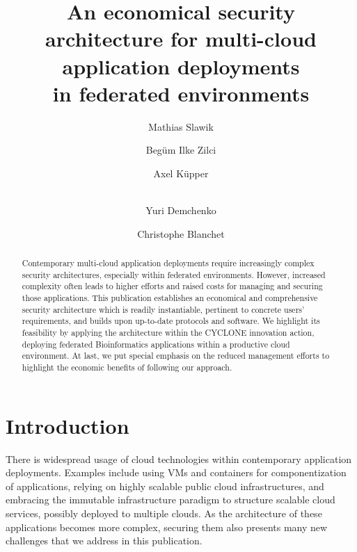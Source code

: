 \documentclass{llncs}
\begin{document}
\pagestyle{headings} 
\mainmatter              %

\title{An economical security architecture for multi-cloud application deployments\\ in federated environments}


\author{Mathias Slawik \and Begüm Ilke Zilci \and Axel Küpper \and\\ Yuri Demchenko \and Christophe Blanchet}



\maketitle              %

\begin{abstract}
Contemporary multi-cloud application deployments require increasingly complex security architectures, especially within federated environments. However, increased complexity often leads to higher efforts and raised costs for managing and securing those applications. This publication establishes an economical and comprehensive security architecture which is readily instantiable, pertinent to concrete users' requirements, and builds upon up-to-date protocols and software. We highlight its feasibility by applying the architecture within the CYCLONE innovation action, deploying federated Bioinformatics applications within a productive cloud environment. At last, we put special emphasis on the reduced management efforts to highlight the economic benefits of following our approach.
\end{abstract}

\section{Introduction}

There is widespread usage of cloud technologies within contemporary application deployments. Examples include using VMs and containers for componentization of applications, relying on highly scalable public cloud infrastructures, and embracing the immutable infrastructure paradigm to structure scalable cloud services, possibly deployed to multiple clouds. As the architecture of these applications becomes more complex, securing them also presents many new challenges that we address in this publication.
\end{document}

